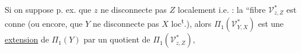 Si on suppose p. ex. que $z$ ne disconnecte pas $Z$ localement i.e. :  la ``fibre $\mathcal V^*_{z,Z}$ est conne
(ou encore, que $Y$ ne disconnecte pas $X$ loc\textsuperscript{t}.), alors $\Pi_1(\mathcal V^*_{Y,X})$ est une \uline{extension} de $\Pi_1(Y)$ par un quotient de $\Pi_1(\mathcal V^*_{z,Z})$, 

